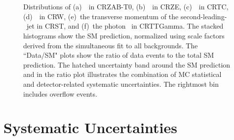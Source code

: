 \begin{figure}[htpb]
  \begin{center}
    \\
    \\

    \caption[Distribution of kinematic variables in CRZ, CRTC, CRW, CRST, and CRTTGamma.]{Distributions of (a)~\mttwoprime\ in CRZAB-T0, (b)~\metprime\ in CRZE, (c)~\rISR\ in CRTC, 
      (d)~\mtbmax\ in CRW, (e)~the transverse momentum of the second-leading-\pT\ jet in CRST,  and
      (f)~the photon \pT\ in CRTTGamma. The stacked histograms show the SM prediction, normalized using scale factors derived from the simultaneous fit to all backgrounds. The ``Data/SM" plots show the ratio of data events to the total SM prediction. The hatched uncertainty band around the SM prediction and in the ratio plot illustrates the combination of MC statistical and detector-related systematic uncertainties. The rightmost bin includes overflow events.}
    \label{fig:CRs}
  \end{center}
\end{figure}


\section{Systematic Uncertainties}
\label{sec:Systematics}

